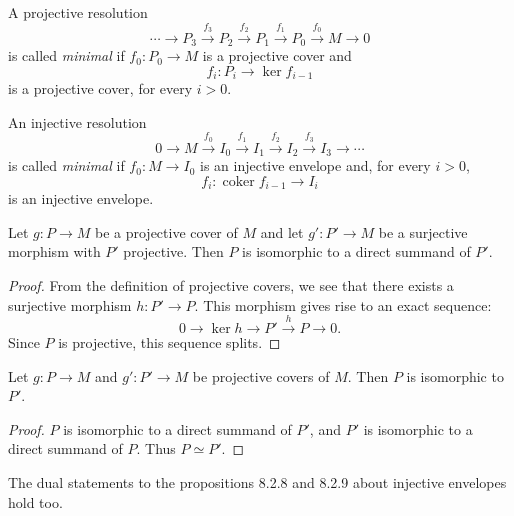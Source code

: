 \documentclass[11pt, a4paper]{report}
\begin{document}
        \begin{definition}
        A projective resolution
        \[
        \cdots \longrightarrow P_3 \xrightarrow{f_3} P_2 \xrightarrow{f_2} P_1 \xrightarrow{f_1} P_0 \xrightarrow{f_0} M \longrightarrow 0
        \]
        is called \emph{minimal} if $f_0 \colon P_0 \to M$ is a projective cover and
        \[
        f_i \colon P_i \to \ker f_{i-1}
        \]
        is a projective cover, for every $i>0$.

        An injective resolution
        \[
        0 \longrightarrow M \xrightarrow{f_0} I_0 \xrightarrow{f_1} I_1 \xrightarrow{f_2} I_2 \xrightarrow{f_3} I_3 \longrightarrow \cdots
        \]
        is called \emph{minimal} if $f_0 \colon M \to I_0$ is an injective envelope and, for every $i>0$,
        \[
        f_i \colon \operatorname{coker} f_{i-1} \to I_i
        \]
        is an injective envelope.
        \end{definition}

        \begin{proposition}
            Let $g:P\to M$ be a projective cover of $M$ and let $g':P'\to M$ be a surjective morphism with $P'$ projective. Then $P$ is isomorphic to a direct summand of $P'$.
        \end{proposition}

        \begin{proof}
        From the definition of projective covers, we see that there exists a surjective morphism $h:P'\to P$. This morphism gives rise to an exact sequence:
        \[
        0 \longrightarrow \ker h \longrightarrow P' \xrightarrow{\,h\,} P \longrightarrow 0.
        \]
        Since $P$ is projective, this sequence splits.
        \end{proof}

        \begin{proposition}
            Let $g:P\to M$ and $g':P'\to M$ be projective covers of $M$. Then $P$ is isomorphic to $P'$.
        \end{proposition}

        \begin{proof}
        $P$ is isomorphic to a direct summand of $P'$, and $P'$ is isomorphic to a direct summand of $P$. Thus $P\simeq P'$.
        \end{proof}

        \begin{remark}
            The dual statements to the propositions 8.2.8 and 8.2.9 about injective envelopes hold too.
        \end{remark}
\end{document}
